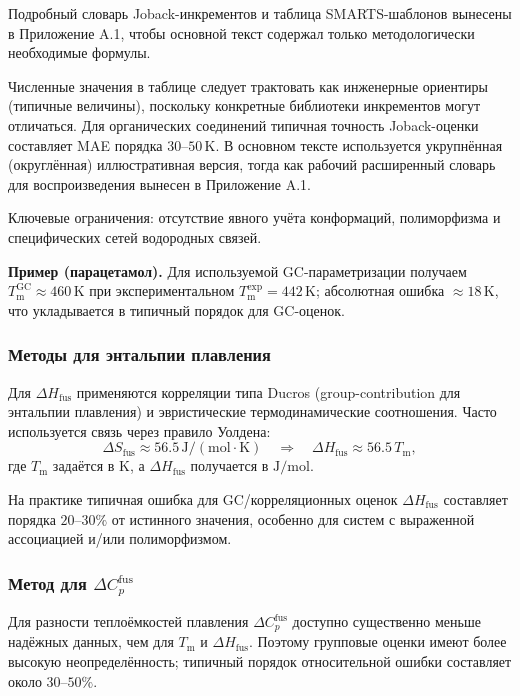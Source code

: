 \documentclass[11pt]{article}
\begin{document}
Подробный словарь Joback-инкрементов и таблица SMARTS-шаблонов вынесены в Приложение A.1, чтобы основной текст содержал только методологически необходимые формулы.

Численные значения в таблице следует трактовать как инженерные ориентиры (типичные величины), поскольку конкретные библиотеки инкрементов могут отличаться. Для органических соединений типичная точность Joback-оценки составляет MAE порядка $30$--$50\,\mathrm{K}$. В основном тексте используется укрупнённая (округлённая) иллюстративная версия, тогда как рабочий расширенный словарь для воспроизведения вынесен в Приложение A.1.

Ключевые ограничения: отсутствие явного учёта конформаций, полиморфизма и специфических сетей водородных связей.

\textbf{Пример (парацетамол).} Для используемой GC-параметризации получаем $T_{\mathrm{m}}^{\mathrm{GC}}\approx460\,\mathrm{K}$ при экспериментальном $T_{\mathrm{m}}^{\mathrm{exp}}=442\,\mathrm{K}$; абсолютная ошибка $\approx18\,\mathrm{K}$, что укладывается в типичный порядок для GC-оценок.

\subsubsection{Методы для энтальпии плавления}

Для $\Delta H_{\mathrm{fus}}$ применяются корреляции типа Ducros (group-contribution для энтальпии плавления) и эвристические термодинамические соотношения. Часто используется связь через правило Уолдена:
\begin{equation*}
\Delta S_{\mathrm{fus}} \approx 56.5\,\mathrm{J/(mol\cdot K)}
\quad \Rightarrow \quad
\Delta H_{\mathrm{fus}} \approx 56.5\,T_{\mathrm{m}},
\end{equation*}
где $T_{\mathrm{m}}$ задаётся в $\mathrm{K}$, а $\Delta H_{\mathrm{fus}}$ получается в $\mathrm{J/mol}$.

На практике типичная ошибка для GC/корреляционных оценок $\Delta H_{\mathrm{fus}}$ составляет порядка $20$--$30\%$ от истинного значения, особенно для систем с выраженной ассоциацией и/или полиморфизмом.

\subsubsection{Метод для $\Delta C_p^{\mathrm{fus}}$}

Для разности теплоёмкостей плавления $\Delta C_p^{\mathrm{fus}}$ доступно существенно меньше надёжных данных, чем для $T_{\mathrm{m}}$ и $\Delta H_{\mathrm{fus}}$. Поэтому групповые оценки имеют более высокую неопределённость; типичный порядок относительной ошибки составляет около $30$--$50\%$.
\end{document}
